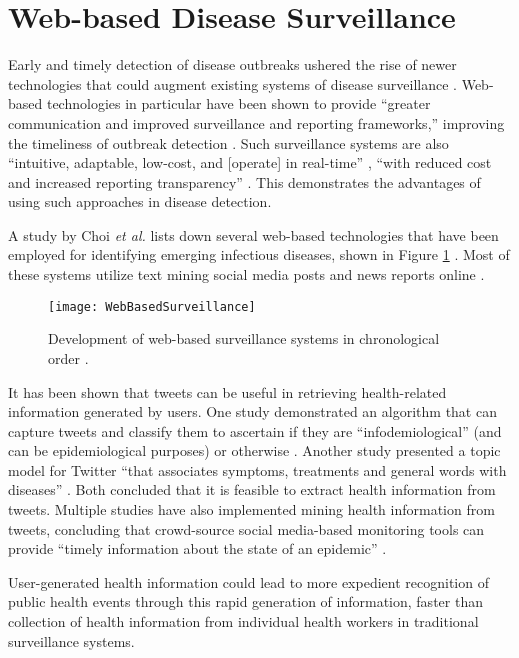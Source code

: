 \section{Web-based Disease Surveillance}

Early and timely detection of disease outbreaks ushered the rise of newer technologies that could augment existing systems of disease surveillance \cite{chunara2012new}. Web-based technologies in particular have been shown to provide ``greater communication and improved surveillance and reporting frameworks,'' improving the timeliness of outbreak detection \cite{chan2010global}. Such surveillance systems are also ``intuitive, adaptable, low-cost, and [operate] in real-time'' \cite{choi2016web}, ``with reduced cost and increased reporting transparency'' \cite{wilson2009early}. This demonstrates the advantages of using such approaches in disease detection. 

A study by Choi \textit{et al.} lists down several web-based technologies that have been employed for identifying emerging infectious diseases, shown in Figure \ref{fig:webbased} \cite{choi2016web}. Most of these systems utilize text mining social media posts and news reports online \cite{brownstein2009digital}. 

\begin{figure}[t]
    \centering
    \texttt{[image: WebBasedSurveillance]}
	\caption{Development of web-based surveillance systems in chronological order \cite{choi2016web}.}
	\label{fig:webbased}
\end{figure}

It has been shown that tweets can be useful in retrieving health-related information generated by users. One study demonstrated an algorithm that can capture tweets and classify them to ascertain if they are ``infodemiological'' (and can be epidemiological purposes) or otherwise \cite{espina2016towards}. Another study presented a topic model for Twitter ``that associates symptoms, treatments and general words with diseases'' \cite{paul2012model}. Both concluded that it is feasible to extract health information from tweets. Multiple studies have also implemented mining health information from tweets, concluding that crowd-source social media-based monitoring tools can provide ``timely information about the state of an epidemic'' \cite{lampos2010tracking, boulos2011crowdsourcing}.

User-generated health information could lead to more expedient recognition of public health events \cite{velasco2014social} through this rapid generation of information, faster than collection of health information from individual health workers in traditional surveillance systems.

